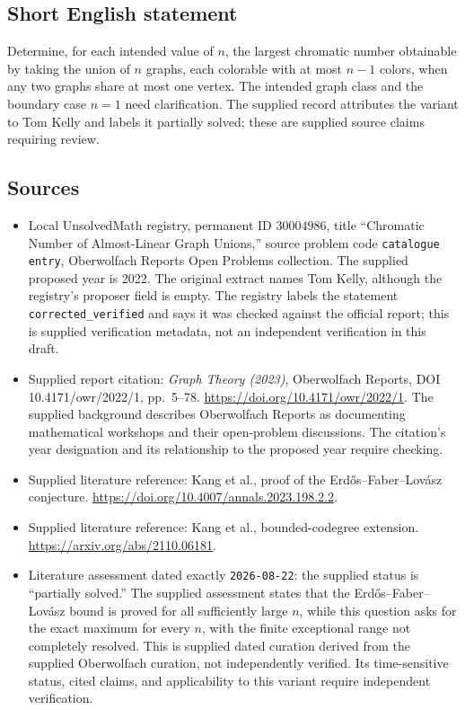 \documentclass[11pt]{article}
\begin{document}
\subsection{Short English statement}
Determine, for each intended value of \(n\), the largest chromatic number obtainable by taking the union of \(n\) graphs, each colorable with at most \(n-1\) colors, when any two graphs share at most one vertex. The intended graph class and the boundary case \(n=1\) need clarification. The supplied record attributes the variant to Tom Kelly and labels it partially solved; these are supplied source claims requiring review.
\subsection{Sources}
\begin{itemize}
\item Local UnsolvedMath registry, permanent ID \(30004986\), title ``Chromatic Number of Almost-Linear Graph Unions,'' source problem code \texttt{catalogue entry}, Oberwolfach Reports Open Problems collection. The supplied proposed year is 2022. The original extract names Tom Kelly, although the registry's proposer field is empty. The registry labels the statement \texttt{corrected\_verified} and says it was checked against the official report; this is supplied verification metadata, not an independent verification in this draft.
\item Supplied report citation: \emph{Graph Theory (2023)}, Oberwolfach Reports, DOI 10.4171/owr/2022/1, pp.~5--78. \url{https://doi.org/10.4171/owr/2022/1}. The supplied background describes Oberwolfach Reports as documenting mathematical workshops and their open-problem discussions. The citation's year designation and its relationship to the proposed year require checking.
\item Supplied literature reference: Kang et al., proof of the Erd\H{o}s--Faber--Lov\'asz conjecture. \url{https://doi.org/10.4007/annals.2023.198.2.2}.
\item Supplied literature reference: Kang et al., bounded-codegree extension. \url{https://arxiv.org/abs/2110.06181}.
\item Literature assessment dated exactly \texttt{2026-08-22}: the supplied status is ``partially solved.'' The supplied assessment states that the Erd\H{o}s--Faber--Lov\'asz bound is proved for all sufficiently large \(n\), while this question asks for the exact maximum for every \(n\), with the finite exceptional range not completely resolved. This is supplied dated curation derived from the supplied Oberwolfach curation, not independently verified. Its time-sensitive status, cited claims, and applicability to this variant require independent verification.
\end{itemize}
\end{document}
